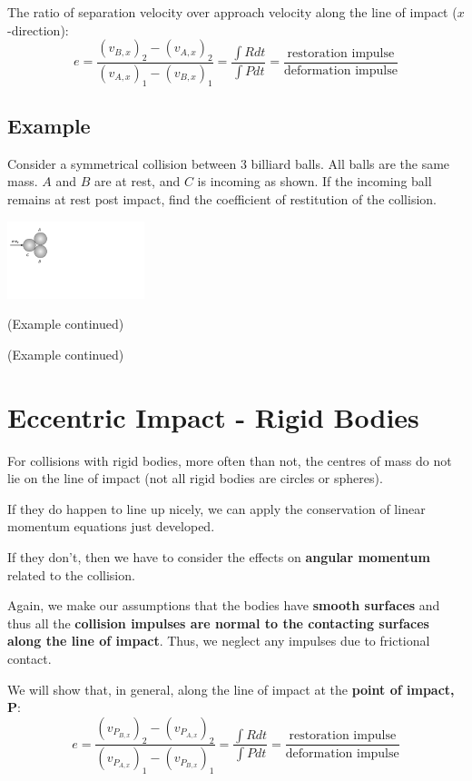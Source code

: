 \documentclass[12pt,letterpaper,twoside]{report}
\begin{document}
The ratio of separation velocity over approach velocity along the line of impact ($x$-direction): 
\[
e = \displaystyle \frac{(v_{B,x})_2 - (v_{A,x})_2}{(v_{A,x})_1 - (v_{B,x})_1} = \frac{\displaystyle \int R dt}{\displaystyle \int P dt} = \frac{\text{restoration impulse}}{\text{deformation impulse}}
\]

\newpage

\subsection{Example}
Consider a symmetrical collision between 3 billiard balls.  All balls are the same mass.  $A$ and $B$ are at rest, and $C$ is incoming as shown. If the incoming ball remains at rest post impact, find the coefficient of restitution of the collision.

\includegraphics[trim={0cm 8cm 20cm 0cm},clip,width=0.3\textwidth, left]{Slide113}

\newpage
(Example continued)

\newpage 
(Example continued)

\newpage

\section{Eccentric Impact - Rigid Bodies}
For collisions with rigid bodies, more often than not, the centres of mass do not lie on the line of impact (not all rigid bodies are circles or spheres).

If they do happen to line up nicely, we can apply the conservation of linear momentum equations just developed.

If they don’t, then we have to consider the effects on \textbf{angular momentum} related to the collision.  

Again, we make our assumptions that the bodies have \textbf{smooth surfaces} and thus all the \textbf{collision impulses are normal to the contacting surfaces along the line of impact}.  Thus, we neglect any impulses due to frictional contact.  

\vspace*{15\baselineskip}

We will show that, in general, along the line of impact at the \textbf{point of impact, }$\bm{P}$:
\[
e = \displaystyle \frac{ \displaystyle (v_{P_{B,x}})_2 - (v_{P_{A,x}})_2}{ \displaystyle (v_{P_{A,x}})_1 - (v_{P_{B,x}})_1} = \frac{\displaystyle \int R dt}{\displaystyle \int P dt} = \frac{\text{restoration impulse}}{\text{deformation impulse}}
\]
\end{document}
